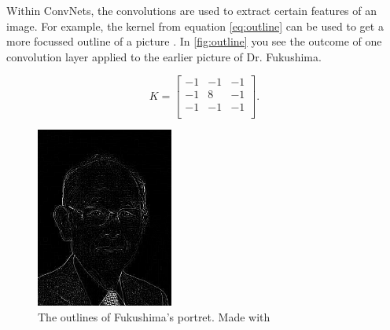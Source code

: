 Within ConvNets, the convolutions are used to extract certain features of an image. For example, the kernel from equation \eqref{eq:outline} can be used to get a more focussed outline of a picture \cite{visual}. In \autoref{fig:outline} you see the outcome of one convolution layer applied to the earlier picture of Dr. Fukushima.

\begin{equation}\label{eq:outline}
    K =
    \begin{bmatrix}
     -1 & -1 & -1 \\
     -1 & 8 & -1 \\
     -1 & -1 & -1 \\
    \end{bmatrix}.
\end{equation}

\begin{figure}
    \centering
    \includegraphics[width=0.4\textwidth]{images/Fukushima-outline.png}
    \caption{The outlines of Fukushima's portret. Made with \cite{visual}}
    \label{fig:outline}
\end{figure}













